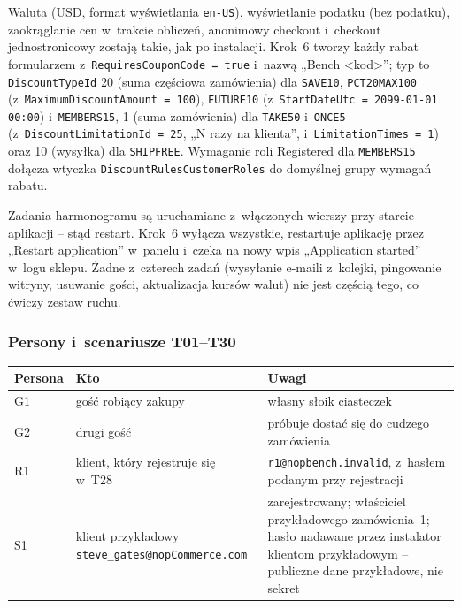 Waluta (USD, format wyświetlania \texttt{en-US}), wyświetlanie podatku (bez podatku),
zaokrąglanie cen w~trakcie obliczeń, anonimowy checkout i~checkout jednostronicowy
zostają takie, jak po instalacji. Krok~6 tworzy każdy rabat formularzem
 z~\texttt{RequiresCouponCode = true} i~nazwą
„Bench <kod>”; typ to \texttt{DiscountTypeId} 20 (suma częściowa zamówienia) dla
\texttt{SAVE10}, \texttt{PCT20MAX100} (z~\texttt{MaximumDiscountAmount = 100}),
\texttt{FUTURE10} (z~\texttt{StartDateUtc = 2099-01-01 00:00}) i~\texttt{MEMBERS15},
1 (suma zamówienia) dla \texttt{TAKE50} i~\texttt{ONCE5} (z~\texttt{DiscountLimitationId
= 25}, „N razy na klienta”, i~\texttt{LimitationTimes = 1}) oraz 10 (wysyłka) dla
\texttt{SHIPFREE}. Wymaganie roli Registered dla \texttt{MEMBERS15} dołącza wtyczka
\texttt{DiscountRulesCustomerRoles} do domyślnej grupy wymagań rabatu.

Zadania harmonogramu są uruchamiane z~włączonych wierszy przy starcie aplikacji -- stąd
restart. Krok~6 wyłącza wszystkie, restartuje aplikację przez „Restart application”
w~panelu i~czeka na nowy wpis „Application started” w~logu sklepu. Żadne z~czterech zadań
(wysyłanie e-maili z~kolejki, pingowanie witryny, usuwanie gości, aktualizacja kursów
walut) nie jest częścią tego, co ćwiczy zestaw ruchu.


\subsubsection{Persony i~scenariusze T01--T30}\label{sec:bench-ruch-scenariusze}

\begin{center}
\small
\begin{tabularx}{\linewidth}{@{}l l X@{}}
\toprule
Persona & Kto & Uwagi \\
\midrule
G1 & gość robiący zakupy & własny słoik ciasteczek \\
G2 & drugi gość & próbuje dostać się do cudzego zamówienia \\
R1 & klient, który rejestruje się w~T28 & \texttt{r1@nopbench.invalid}, z~hasłem podanym
  przy rejestracji \\
S1 & klient przykładowy \texttt{steve\_gates@nopCommerce.com} & zarejestrowany; właściciel
  przykładowego zamówienia~1; hasło nadawane przez instalator klientom przykładowym --
  publiczne dane przykładowe, nie sekret \\
\bottomrule
\end{tabularx}
\end{center}

